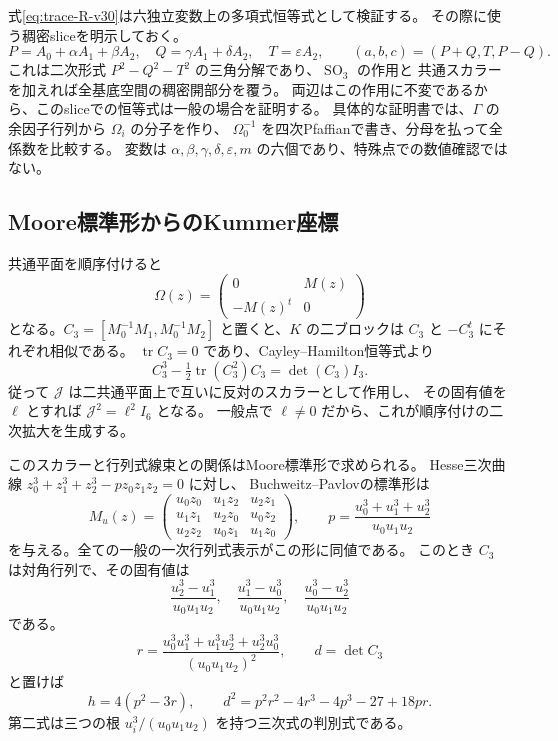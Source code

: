 式\eqref{eq:trace-R-v30}は六独立変数上の多項式恒等式として検証する。
その際に使う稠密sliceを明示しておく。
\[
 P=A_0+\alpha A_1+\beta A_2,\quad
 Q=\gamma A_1+\delta A_2,\quad T=\varepsilon A_2,
 \qquad (a,b,c)=(P+Q,T,P-Q).
\]
これは二次形式 $P^2-Q^2-T^2$ の三角分解であり、$\operatorname{SO}_3$ の作用と
共通スカラーを加えれば全基底空間の稠密開部分を覆う。
両辺はこの作用に不変であるから、このsliceでの恒等式は一般の場合を証明する。
具体的な証明書では、$\Gamma$ の余因子行列から $\Omega_i$ の分子を作り、
$\Omega_0^{-1}$ を四次Pfaffianで書き、分母を払って全係数を比較する。
変数は $\alpha,\beta,\gamma,\delta,\varepsilon,m$ の六個であり、特殊点での数値確認ではない。

\subsection{Moore標準形からのKummer座標}

共通平面を順序付けると
\[
 \Omega(z)=\begin{pmatrix}0&M(z)\\-M(z)^t&0\end{pmatrix}
\]
となる。$C_3=[M_0^{-1}M_1,M_0^{-1}M_2]$ と置くと、$K$ の二ブロックは
$C_3$ と $-C_3^t$ にそれぞれ相似である。
$\operatorname{tr}C_3=0$ であり、Cayley--Hamilton恒等式より
\[
 C_3^3-\tfrac12\operatorname{tr}(C_3^2)C_3=\det(C_3)I_3.
\]
従って $\mathscr J$ は二共通平面上で互いに反対のスカラーとして作用し、
その固有値を $\ell$ とすれば $\mathscr J^2=\ell^2I_6$ となる。
一般点で $\ell\ne0$ だから、これが順序付けの二次拡大を生成する。

このスカラーと行列式線束との関係はMoore標準形で求められる。
Hesse三次曲線 $z_0^3+z_1^3+z_2^3-pz_0z_1z_2=0$ に対し、
Buchweitz--Pavlovの標準形\cite[Theorem A and Remark 1.4(b)]{BuchweitzPavlovMoore}は
\[
 M_u(z)=\begin{pmatrix}
 u_0z_0&u_1z_2&u_2z_1\\
 u_1z_1&u_2z_0&u_0z_2\\
 u_2z_2&u_0z_1&u_1z_0
 \end{pmatrix},\qquad
 p=\frac{u_0^3+u_1^3+u_2^3}{u_0u_1u_2}
\]
を与える。全ての一般の一次行列式表示がこの形に同値である。
このとき $C_3$ は対角行列で、その固有値は
\[
 \frac{u_2^3-u_1^3}{u_0u_1u_2},\quad
 \frac{u_1^3-u_0^3}{u_0u_1u_2},\quad
 \frac{u_0^3-u_2^3}{u_0u_1u_2}
\]
である。
\[
 r=\frac{u_0^3u_1^3+u_1^3u_2^3+u_2^3u_0^3}{(u_0u_1u_2)^2},\qquad d=\det C_3
\]
と置けば
\begin{equation}\label{eq:Moore-trace-v30}
 h=4(p^2-3r),\qquad
 d^2=p^2r^2-4r^3-4p^3-27+18pr.
\end{equation}
第二式は三つの根 $u_i^3/(u_0u_1u_2)$ を持つ三次式の判別式である。

